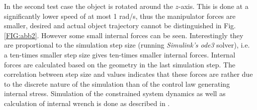 \documentclass[a4paper,twoside, openright,12pt]{report}
\begin{document}


In the second test case the object is rotated around the $ z $-axis. This is done at a significantly lower speed of at most 1 rad/s, thus the manipulator forces are smaller, desired and actual object trajectory cannot be distinguished in Fig. \ref{FIG:abb2}. However some small internal forces can be seen. Interestingly they are proportional to the simulation step size (running \emph{Simulink's ode3} solver), i.e. a ten-times smaller step size gives ten-times smaller internal forces. Internal forces are calculated based on the geometry in the last simulation step. The correlation between step size and values indicates that these forces are rather due to the discrete nature of the simulation than of the control law generating internal stress. Simulation of the constrained system dynamics as well as calculation of internal wrench is done as described in \cite{Erhart_15/2}.
\end{document}
